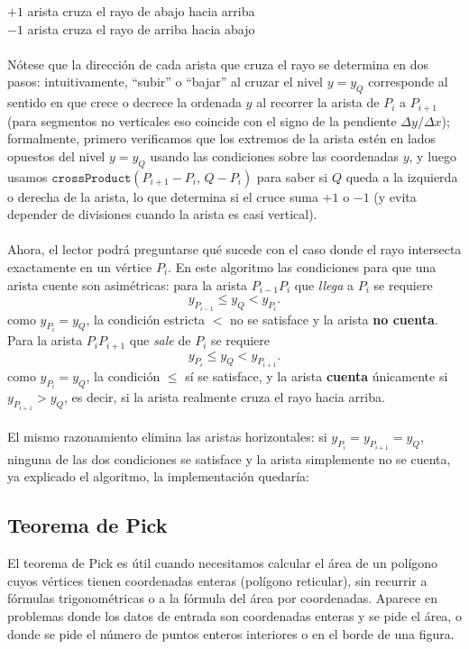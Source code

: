 \vspace{4pt}
{\small
\textcolor{green!60!black}{$+1$} \quad arista cruza el rayo de abajo hacia arriba\\
\textcolor{orange!80!red}{$-1$} \quad arista cruza el rayo de arriba hacia abajo
}
\\\\
Nótese que la dirección de cada arista que cruza el rayo se determina en dos pasos: 
intuitivamente, ``subir'' o ``bajar'' al cruzar el nivel $y=y_Q$ corresponde al sentido en que crece o decrece la ordenada $y$ al recorrer la arista de $P_i$ a $P_{i+1}$ (para segmentos no verticales eso coincide con el signo de la pendiente $\Delta y/\Delta x$); formalmente, 
primero verificamos que los extremos de la arista estén en lados opuestos del nivel 
$y = y_Q$ usando las condiciones sobre las coordenadas $y$, y luego usamos 
$\texttt{crossProduct}(P_{i+1}-P_i,\, Q-P_i)$ para saber si $Q$ queda a la izquierda o 
derecha de la arista, lo que determina si el cruce suma $+1$ o $-1$ (y evita depender de divisiones cuando la arista es casi vertical).
\\\\Ahora, el lector podrá preguntarse qué sucede con el caso donde el rayo intersecta 
exactamente en un vértice $P_i$. En este algoritmo las condiciones para que una arista 
cuente son asimétricas: para la arista $P_{i-1}P_i$ que \textit{llega} a $P_i$ se requiere
\[y_{P_{i-1}} \leq y_Q < y_{P_i}.\]
como $y_{P_i} = y_Q$, la condición estricta $<$ no se satisface y la arista \textbf{no cuenta}. 
Para la arista $P_iP_{i+1}$ que \textit{sale} de $P_i$ se requiere
\[y_{P_i} \leq y_Q < y_{P_{i+1}}.\]
como $y_{P_i} = y_Q$, la condición $\leq$ sí se satisface, y la arista \textbf{cuenta} 
únicamente si $y_{P_{i+1}} > y_Q$, es decir, si la arista realmente cruza el rayo hacia 
arriba.
\\\\
El mismo razonamiento elimina las aristas horizontales: si $y_{P_i} = y_{P_{i+1}} = y_Q$, 
ninguna de las dos condiciones se satisface y la arista simplemente no se cuenta, ya explicado el algoritmo, la implementación quedaría:

\subsection*{Teorema de Pick}
El teorema de Pick es útil cuando necesitamos calcular el área de un polígono cuyos vértices tienen coordenadas enteras (polígono reticular), sin recurrir a fórmulas trigonométricas o a la fórmula del área por coordenadas. Aparece en problemas donde los datos de entrada son coordenadas enteras y se pide el área, o donde se pide el número de puntos enteros interiores o en el borde de una figura.

